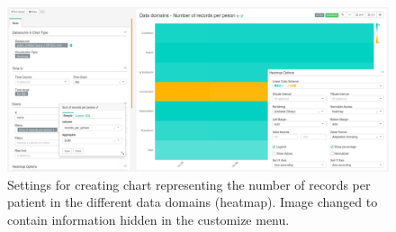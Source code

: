 \documentclass[
]{book}
\begin{document}
\begin{figure}
\includegraphics[width=1\linewidth]{images/dataDomainsNumberOfRecordsPerPeson} \caption{Settings for creating chart representing the number of records per patient in the different data domains (heatmap). Image changed to contain information hidden in the customize menu.}\label{fig:dataDomainsNumberOfRecordsPerPeson}
\end{figure}

  
\end{document}
